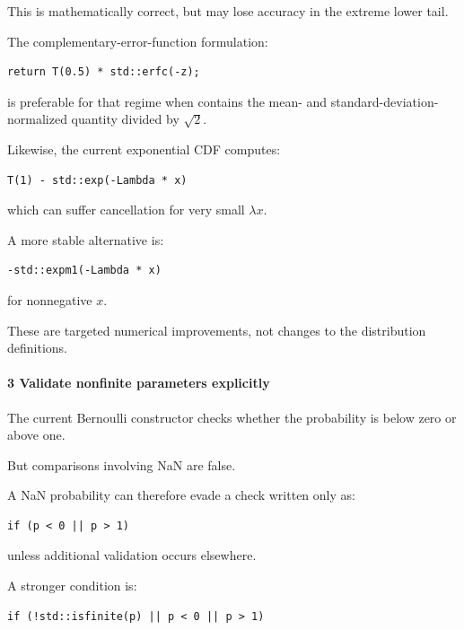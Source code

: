 This is mathematically correct, but may lose accuracy in the extreme lower tail.

The complementary-error-function formulation:

\begin{verbatim}
return T(0.5) * std::erfc(-z);
\end{verbatim}

is preferable for that regime when  contains the mean- and standard-deviation-normalized quantity divided by \(\sqrt2\).

Likewise, the current exponential CDF computes:

\begin{verbatim}
T(1) - std::exp(-Lambda * x)
\end{verbatim}

which can suffer cancellation for very small \(\lambda x\).

A more stable alternative is:

\begin{verbatim}
-std::expm1(-Lambda * x)
\end{verbatim}

for nonnegative \(x\).

These are targeted numerical improvements, not changes to the distribution definitions.

\paragraph{3 Validate nonfinite parameters explicitly}\label{02-foundations-ii-ch039-validate-nonfinite-parameters-explicitly}

\hypertarget{02-foundations-ii-ch039-validate-nonfinite-parameters-explicitly}{}

The current Bernoulli constructor checks whether the probability is below zero or above one.

But comparisons involving NaN are false.

A NaN probability can therefore evade a check written only as:

\begin{verbatim}
if (p < 0 || p > 1)
\end{verbatim}

unless additional validation occurs elsewhere.

A stronger condition is:

\begin{verbatim}
if (!std::isfinite(p) || p < 0 || p > 1)
\end{verbatim}

